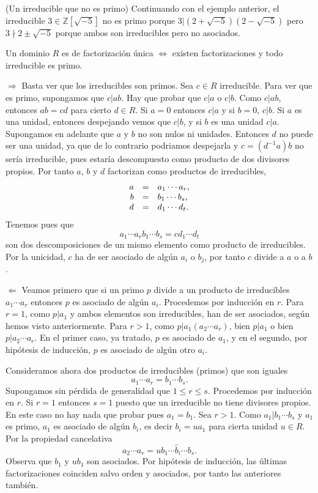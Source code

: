 \textrm{\normalfont (Un irreducible que no es primo)}
Continuando con el ejemplo anterior, el irreducible
\(3\in \mathbb Z[\sqrt{-5}]\) no es primo porque
\(3|(2+\sqrt{-5})(2-\sqrt{-5})\) pero \(3\nmid 2\pm \sqrt{-5}\) porque
ambos son irreducibles pero no asociados. 


Un dominio \(R\) es de factorización única \(\Leftrightarrow\) existen
factorizaciones y todo irreducible es primo. 


\(\Rightarrow\) Basta ver que los irreducibles son primos. Sea
\(c\in R\) irreducible. Para ver que es primo, supongamos que \(c|ab\).
Hay que probar que \(c|a\) o \(c|b\). Como \(c|ab\), entonces \(ab=cd\)
para cierto \(d\in R\). Si \(a=0\) entonces \(c|a\) y si \(b=0\),
\(c|b\). Si \(a\) es una unidad, entonces despejando vemos que \(c|b\),
y si \(b\) es una unidad \(c|a\). Supongamos en adelante que \(a\) y
\(b\) no son nulos ni unidades. Entonces \(d\) no puede ser una unidad,
ya que de lo contrario podriamos despejarla y \(c=(d^{-1}a)b\) no sería
irreducible, pues estaría descompuesto como producto de dos divisores
propios. Por tanto \(a\), \(b\) y \(d\) factorizan como productos de
irreducibles, \[\begin{array}{rcl}
a&=&a_1\cdots a_r,\cr
b&=&b_1\cdots b_s,\cr
d&=&d_1\cdots d_t.
\end{array}\] Tenemos pues que
\[a_1\cdots a_rb_1\cdots b_s=cd_1\cdots d_t\] son dos
descomposiciones de un mismo elemento como producto de irreducibles. Por
la unicidad, \(c\) ha de ser asociado de algún \(a_i\) o \(b_j\), por
tanto \(c\) divide a \(a\) o a \(b\).

\(\Leftarrow\) Veamos primero que si un primo \(p\) divide a un producto
de irreducibles \(a_1\cdots a_r\) entonces \(p\) es asociado de algún
\(a_i\). Procedemos por inducción en \(r\). Para \(r=1\), como \(p|a_1\)
y ambos elementos son irreducibles, han de ser asociados, según hemos
visto anteriormente. Para \(r>1\), como \(p|a_1(a_2\cdots a_r)\), bien
\(p|a_1\) o bien \(p|a_2\cdots a_r\). En el primer caso, ya tratado,
\(p\) es asociado de \(a_1\), y en el segundo, por hipótesis de
inducción, \(p\) es asociado de algún otro \(a_i\).

Consideramos ahora dos productos de irreducibles (primos) que son
iguales \[a_1\cdots a_r=b_1\cdots b_s.\] Supongamos sin pérdida de
generalidad que \(1\leq r\leq s\). Procedemos por inducción en \(r\). Si
\(r=1\) entonces \(s=1\) puesto que un irreducible no tiene divisores
propios. En este caso no hay nada que probar pues \(a_1=b_1\). Sea
\(r>1\). Como \(a_1|b_1\cdots b_s\) y \(a_1\) es primo, \(a_1\) es
asociado de algún \(b_i\), es decir \(b_i=ua_1\) para cierta unidad
\(u\in R\). Por la propiedad cancelativa
\[a_2\cdots a_r=ub_1\cdots\widehat{b}_i\cdots b_s.\] Observa que
\(b_1\) y \(ub_1\) son asociados. Por hipótesis de inducción, las
últimas factorizaciones coinciden salvo orden y asociados, por tanto las
anteriores también. 


